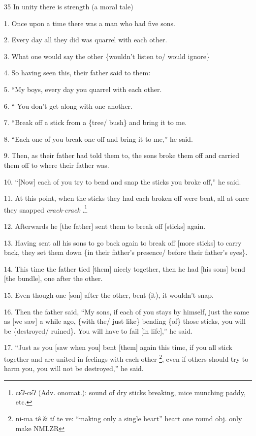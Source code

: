 
35 In unity there is strength (a moral tale)

1. Once upon a time there was a man who had five sons.

2. Every day all they did was quarrel with each other.

3. What one would say the other \{wouldn't listen to/ would ignore\}

4. So having seen this, their father said to them:

5. ``My boys, every day you quarrel with each other.

6. `` You don't get along with one another.

7. ``Break off a stick from a \{tree/ bush\} and bring it to me.

8. ``Each one of you break one off and bring it to me,'' he said.

9. Then, as their father had told them to, the sons broke them off and carried
them off to where their father was.

10. ``[Now] each of you try to bend and snap the sticks you broke off,'' he said.

11. At this point, when the sticks they had each broken off were bent, all at once
they snapped \textit{crack-crack} .\footnote{cɛ̂ʔ-cɛ̂ʔ (Adv. onomat.): sound of dry sticks breaking, mice munching paddy, etc.}

12. Afterwards he [the father] sent them to break off [sticks] again.

13. Having sent all his sons to go back again to break off [more sticks] to carry
back, they set them down \{in their father's presence/ before their father's eyes\}.

14. This time the father tied [them] nicely together, then he had [his sons] bend
[the bundle], one after the other.

15. Even though one [son] after the other, bent (it), it wouldn't snap.

16. Then the father said, ``My sons, if each of you stays by himself, just the
same as [we saw] a while ago, \{with the/ just like\} bending \{of\} those sticks,
you will be \{destroyed/ ruined\}.  You will have to fail [in life],'' he said.

17. ``Just as you [saw when you] bent [them] again this time, if you all stick
together and are united in feelings with each other \footnote{ni-ma  tê  šī   tí  te  ve: ``making only a single heart''  heart   one round obj. only make NMLZR}, even if others should
try to harm you, you will not be destroyed,'' he said.

